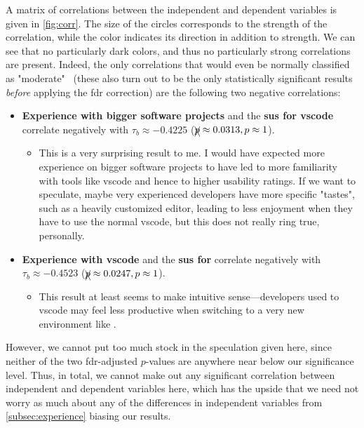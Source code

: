 \documentclass[../thesis]{subfiles}
\begin{document}
A matrix of correlations between the independent and dependent variables is given in \cref{fig:corr}.
The size of the circles corresponds to the strength of the correlation, while the color indicates its direction in addition to strength.
We can see that no particularly dark colors, and thus no particularly strong correlations are present.
Indeed, the only correlations that would even be normally classified as "moderate"~\cite{akoglu2018} (these also turn out to be the only statistically significant results \emph{before} applying the \gls{fdr} correction) are the following two negative correlations:
\begin{itemize}
	\item \textbf{Experience with bigger software projects} and the \textbf{\gls{sus} for \gls{vscode}} correlate negatively with $\tau_b \approx -0.4225$ ($\xcancel{p} \approx 0.0313, p \approx 1$).
	      \begin{itemize}
		      \item This is a very surprising result to me.
		            I would have expected more experience on bigger software projects to have led to more familiarity with tools like \gls{vscode} and hence to higher usability ratings.
		            If we want to speculate, maybe very experienced developers have more specific "tastes", such as a heavily customized editor, leading to less enjoyment when they have to use the normal \gls{vscode}, but this does not really ring true, personally.
	      \end{itemize}
	\item \textbf{Experience with \gls{vscode}} and the \textbf{\gls{sus} for \SEE{}} correlate negatively with $\tau_b \approx -0.4523$ ($\xcancel{p} \approx 0.0247, p \approx 1$).
	      \begin{itemize}
		      \item This result at least seems to make intuitive sense---developers used to \gls{vscode} may feel less productive when switching to a very new environment like \SEE{}.
	      \end{itemize}
\end{itemize}

However, we cannot put too much stock in the speculation given here, since neither of the two \gls{fdr}-adjusted $p$-values are anywhere near below our significance level.
Thus, in total, we cannot make out any significant correlation between independent and dependent variables here, which has the upside that we need not worry as much about any of the differences in independent variables from \cref{subsec:experience} biasing our results.
\end{document}
